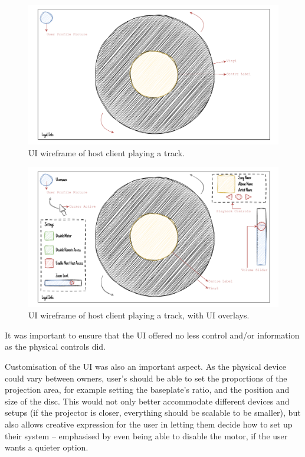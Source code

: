            \begin{figure}[h]
                \centering
                \includegraphics[width=0.85\linewidth]{images/SketchHostMin.pdf}
                \caption{UI wireframe of host client playing a track.}
                \label{fig:sketchHostQuiet}
            \end{figure}
            
            \begin{figure}[h]
                \centering
                \includegraphics[width=0.85\linewidth]{images/SketchHostMax.pdf}
                \caption{UI wireframe of host client playing a track, with UI overlays.}
                \label{fig:sketchHostGui}
            \end{figure}
    
            It was important to ensure that the UI offered no less control and/or information as the physical controls did.
    
            Customisation of the UI was also an important aspect. As the physical device could vary between owners, user's should be able to set the proportions of the projection area, for example setting the baseplate's ratio, and the position and size of the disc. This would not only better accommodate different devices and setups (if the projector is closer, everything should be scalable to be smaller), but also allows creative expression for the user in letting them decide how to set up their system -- emphasised by even being able to disable the motor, if the user wants a quieter option.
        

